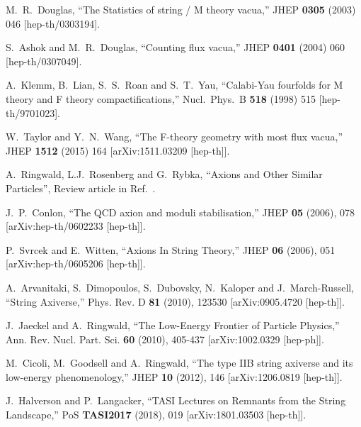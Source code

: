 \documentclass[12pt]{article}
\numberwithin{equation}{section}
\begin{document}
\begin{thebibliography}{999}
  M.~R.~Douglas,
  ``The Statistics of string / M theory vacua,''
  JHEP {\bf 0305} (2003) 046 [hep-th/0303194].

  S.~Ashok and M.~R.~Douglas,
  ``Counting flux vacua,'' JHEP {\bf 0401} (2004) 060 [hep-th/0307049].

  A.~Klemm, B.~Lian, S.~S.~Roan and S.~T.~Yau,
  ``Calabi-Yau fourfolds for M theory and F theory compactifications,''
  Nucl.\ Phys.\ B {\bf 518} (1998) 515 [hep-th/9701023].

  W.~Taylor and Y.~N.~Wang,
  ``The F-theory geometry with most flux vacua,''
  JHEP {\bf 1512} (2015) 164 [arXiv:1511.03209 [hep-th]].

A.~Ringwald, L.J.~Rosenberg and G.~Rybka, ``Axions and Other Similar Particles'', Review article in Ref.~\cite{Tanabashi:2018oca}.

J.~P.~Conlon,
``The QCD axion and moduli stabilisation,''
JHEP \textbf{05} (2006), 078
[arXiv:hep-th/0602233 [hep-th]].

P.~Svrcek and E.~Witten,
``Axions In String Theory,''
JHEP \textbf{06} (2006), 051
[arXiv:hep-th/0605206 [hep-th]].

A.~Arvanitaki, S.~Dimopoulos, S.~Dubovsky, N.~Kaloper and J.~March-Russell,
``String Axiverse,''
Phys. Rev. D \textbf{81} (2010), 123530
[arXiv:0905.4720 [hep-th]].

J.~Jaeckel and A.~Ringwald,
``The Low-Energy Frontier of Particle Physics,''
Ann. Rev. Nucl. Part. Sci. \textbf{60} (2010), 405-437
[arXiv:1002.0329 [hep-ph]].

M.~Cicoli, M.~Goodsell and A.~Ringwald,
``The type IIB string axiverse and its low-energy phenomenology,''
JHEP \textbf{10} (2012), 146
[arXiv:1206.0819 [hep-th]].

J.~Halverson and P.~Langacker,
``TASI Lectures on Remnants from the String Landscape,''
PoS \textbf{TASI2017} (2018), 019
[arXiv:1801.03503 [hep-th]].


\end{thebibliography}
\end{document}

